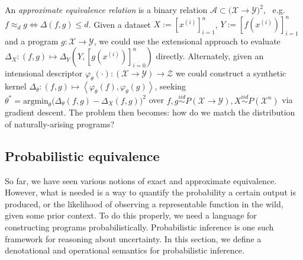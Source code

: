 \documentclass[11pt]{article}
\begin{document}
    \noindent An \textit{approximate equivalence relation} is a binary relation $\mathcal{A} \subset \mathcal (\mathcal X → \mathcal Y)^2$,~ e.g. $f \approx_{d} g \Leftrightarrow \mathbb \Delta(f, g) \leq d$. Given a dataset $X := [x^{(i)}]_{i=1}^n$, $Y := [f(x^{(i)})]_{i=1}^n$ and a program $g: \mathcal{X} → \mathcal{Y}$, we could use the extensional approach to evaluate $\Delta_X: (f, g) \mapsto \Delta_Y(Y, [g(x^{(i)})]_{i=0}^n)$ directly. Alternately, given an intensional descriptor $\varphi_θ(\cdot): (\mathcal X → \mathcal Y) → \mathcal Z$ we could construct a synthetic kernel $\Delta_θ: (f, g) \mapsto \left<\varphi_θ(f), \varphi_θ(g)\right>$, seeking $θ^* = \text{argmin}_θ\big(\Delta_θ(f, g) - \Delta_X(f, g)\big)^2$ over $f, g \overset{iid}{\sim} P(\mathcal X → \mathcal Y), X \overset{iid}{\sim} P(\mathcal X^n)$ via gradient descent. The problem then becomes: how do we match the distribution of naturally-arising programs?




    \pagebreak\subsection{Probabilistic equivalence}\label{sec:pr-eq}

    So far, we have seen various notions of exact and approximate equivalence. However, what is needed is a way to quantify the probability a certain output is produced, or the likelihood of observing a representable function in the wild, given some prior context. To do this properly, we need a language for constructing programs probabilistically. Probabilistic inference is one such framework for reasoning about uncertainty. In this section, we define a denotational and operational semantics for probabilistic inference. \\
\end{document}
